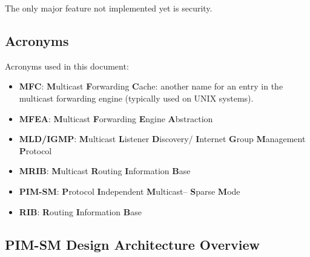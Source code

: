 \documentclass[11pt]{article}
\begin{document}
The only major feature not implemented yet is security.


\subsection{Acronyms}

Acronyms used in this document:

\begin{itemize}

  \item {\bf MFC}: {\bf M}ulticast {\bf F}orwarding {\bf C}ache: another
  name for an entry in the multicast forwarding engine (typically used
  on UNIX systems).

  \item {\bf MFEA}: {\bf M}ulticast {\bf F}orwarding {\bf E}ngine
  {\bf A}bstraction

  \item {\bf MLD/IGMP}: {\bf M}ulticast {\bf L}istener {\bf D}iscovery/{\bf
  I}nternet {\bf G}roup {\bf M}anagement {\bf P}rotocol

  \item {\bf MRIB}: {\bf M}ulticast {\bf R}outing {\bf I}nformation
  {\bf B}ase

  \item {\bf PIM-SM}: {\bf P}rotocol {\bf I}ndependent {\bf M}ulticast--{\bf
  S}parse {\bf M}ode

  \item {\bf RIB}: {\bf R}outing {\bf I}nformation {\bf B}ase

\end{itemize}


\subsection{PIM-SM Design Architecture Overview}
\end{document}
